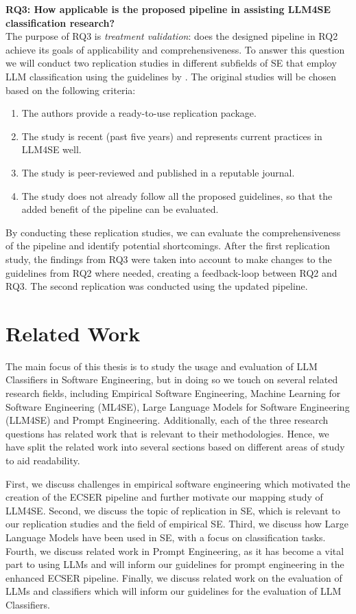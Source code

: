 \documentclass[a4paper]{article}
\newcommand{\emphasize}[1]{\textbf{#1}}
\begin{document}
\emphasize{RQ3: How applicable is the proposed pipeline in assisting LLM4SE classification research?}\\
The purpose of RQ3 is \textit{treatment validation}: does the designed pipeline in RQ2 achieve its goals of applicability and comprehensiveness. To answer this question we will conduct two replication studies in different subfields of SE that employ LLM classification using the guidelines by \textcite{carver2010}. The original studies will be chosen based on the following criteria:
\begin{enumerate}
    \item The authors provide a ready-to-use replication package.
    \item The study is recent (past five years) and represents current practices in LLM4SE well.
    \item The study is peer-reviewed and published in a reputable journal.
    \item The study does not already follow all the proposed guidelines, so that the added benefit of the pipeline can be evaluated.
\end{enumerate}

By conducting these replication studies, we can evaluate the comprehensiveness of the pipeline and identify potential shortcomings. After the first replication study, the findings from RQ3 were taken into account to make changes to the guidelines from RQ2 where needed, creating a feedback-loop between RQ2 and RQ3. The second replication was conducted using the updated pipeline.

\section{Related Work} \label{Related Work}
The main focus of this thesis is to study the usage and evaluation of LLM Classifiers in Software Engineering, but in doing so we touch on several related research fields, including Empirical Software Engineering, Machine Learning for Software Engineering (ML4SE), Large Language Models for Software Engineering (LLM4SE) and Prompt Engineering. Additionally, each of the three research questions has related work that is relevant to their methodologies. Hence, we have split the related work into several sections based on different areas of study to aid readability. 

First, we discuss challenges in empirical software engineering which motivated the creation of the ECSER pipeline and further motivate our mapping study of LLM4SE. Second, we discuss the topic of replication in SE, which is relevant to our replication studies and the field of empirical SE. Third, we discuss how Large Language Models have been used in SE, with a focus on classification tasks. Fourth, we discuss related work in Prompt Engineering, as it has become a vital part to using LLMs and will inform our guidelines for prompt engineering in the enhanced ECSER pipeline. Finally, we discuss related work on the evaluation of LLMs and classifiers which will inform our guidelines for the evaluation of LLM Classifiers.
\end{document}

